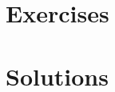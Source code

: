 \documentclass{article}
\newenvironment{exercises}
  {\section{Exercises}\description}
  {\enddescription}
\newenvironment{solutions}
  {\section{Solutions}\description}
  {\enddescription}
\begin{document}
\begin{exercises}
  \begin{exercise}
    \lipsum[4]
  \end{exercise}
  \begin{solution}
    \lipsum[3]
  \end{solution}
  \begin{exercise}
    \lipsum[12]
  \end{exercise}
  \begin{solution}
    \lipsum[23]
  \end{solution}
\end{exercises}

\begin{solutions}
  \printsolutions
\end{solutions}
\end{document}
